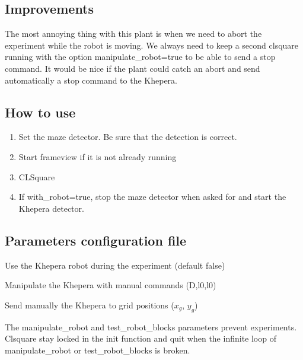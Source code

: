 \subsection{Improvements}
\label{sec:mkp:improvements}

The most annoying thing with this plant is when we need to abort 
the experiment while the robot is moving. We always need to keep a 
second clsquare running with the option manipulate\_robot=true to be 
able to send a stop command. It would be nice if the plant could catch 
an abort and send automatically a stop command to the Khepera.

\subsection{How to use}
\label{sec:mkp:howto}
    \begin{enumerate}
        \item Set the maze detector. Be sure that the detection is correct.
        \item Start frameview if it is not already running
        \item CLSquare
        \item If with\_robot=true, stop the maze detector when asked 
            for and start the Khepera detector.
    \end{enumerate}

\subsection{Parameters configuration file}
\label{sec:mkp:params}
    \begin{description} \itemindent=-15pt
        \item[with\_robot] Use the Khepera robot during the experiment 
            (default false)
        \item[manipulate\_robot] Manipulate the Khepera with manual 
            commands (D,l0,l0)
        \item[test\_robot\_blocks] Send manually the Khepera to grid 
            positions ($x_g$, $y_g$)
    \end{description}

The manipulate\_robot and test\_robot\_blocks parameters prevent 
experiments. Clsquare stay locked in the init function and quit when 
the infinite loop of manipulate\_robot or test\_robot\_blocks is broken. 
